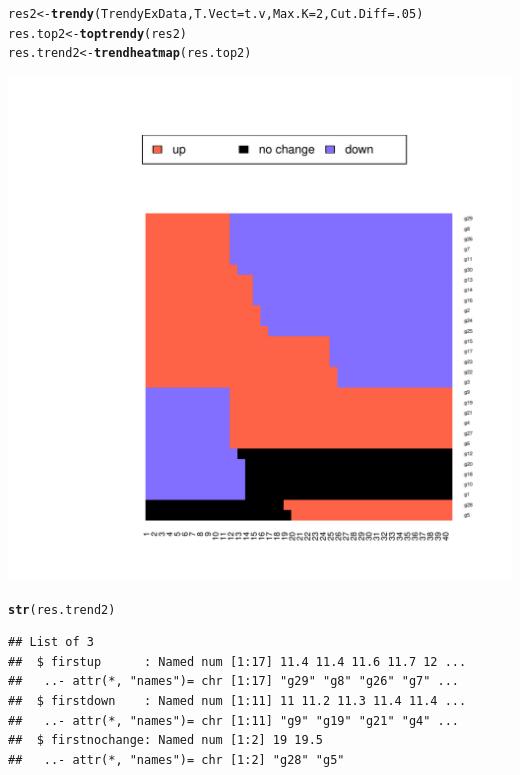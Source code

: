 \documentclass{article}\usepackage[]{graphicx}\usepackage[usenames,dvipsnames]{color}
\makeatletter
\newcommand{\hlnum}[1]{\textcolor[rgb]{0.686,0.059,0.569}{#1}}%
\newcommand{\hlstd}[1]{\textcolor[rgb]{0.345,0.345,0.345}{#1}}%
\newcommand{\hlkwb}[1]{\textcolor[rgb]{0.69,0.353,0.396}{#1}}%
\newcommand{\hlkwc}[1]{\textcolor[rgb]{0.333,0.667,0.333}{#1}}%
\newcommand{\hlkwd}[1]{\textcolor[rgb]{0.737,0.353,0.396}{\textbf{#1}}}%
\newenvironment{kframe}{%
 \def\at@end@of@kframe{}%
 \ifinner\ifhmode%
  \def\at@end@of@kframe{\end{minipage}}%
  \begin{minipage}{\columnwidth}%
 \fi\fi%
 \def\FrameCommand##1{\hskip\@totalleftmargin \hskip-\fboxsep
 \colorbox{shadecolor}{##1}\hskip-\fboxsep
     \hskip-\linewidth \hskip-\@totalleftmargin \hskip\columnwidth}%
 \MakeFramed {\advance\hsize-\width
   \@totalleftmargin\z@ \linewidth\hsize
   \@setminipage}}%
 {\par\unskip\endMakeFramed%
 \at@end@of@kframe}
\newenvironment{knitrout}{}{} %
\makeatother
\begin{document}
\begin{knitrout}
\color{fgcolor}\begin{kframe}
\begin{alltt}
\hlstd{res2} \hlkwb{<-} \hlkwd{trendy}\hlstd{(TrendyExData,} \hlkwc{T.Vect}\hlstd{=t.v,} \hlkwc{Max.K}\hlstd{=}\hlnum{2}\hlstd{,} \hlkwc{Cut.Diff}\hlstd{=}\hlnum{.05}\hlstd{)}
\hlstd{res.top2} \hlkwb{<-} \hlkwd{toptrendy}\hlstd{(res2)}
\hlstd{res.trend2} \hlkwb{<-} \hlkwd{trendheatmap}\hlstd{(res.top2)}
\end{alltt}
\end{kframe}

{\centering \includegraphics[width=.8\textwidth]{figure/unnamed-chunk-17-1} 

}


\begin{kframe}\begin{alltt}
\hlkwd{str}\hlstd{(res.trend2)}
\end{alltt}
\begin{verbatim}
## List of 3
##  $ firstup      : Named num [1:17] 11.4 11.4 11.6 11.7 12 ...
##   ..- attr(*, "names")= chr [1:17] "g29" "g8" "g26" "g7" ...
##  $ firstdown    : Named num [1:11] 11 11.2 11.3 11.4 11.4 ...
##   ..- attr(*, "names")= chr [1:11] "g9" "g19" "g21" "g4" ...
##  $ firstnochange: Named num [1:2] 19 19.5
##   ..- attr(*, "names")= chr [1:2] "g28" "g5"
\end{verbatim}
\end{kframe}
\end{knitrout}
\end{document}
